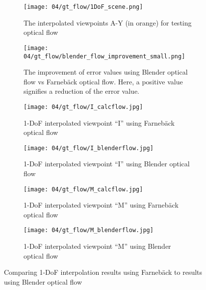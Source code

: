 \begin{figure}
\centering
    \hfill
    \begin{subfigure}[c]{0.4\textwidth}
            \centering
            \texttt{[image: 04/gt\_flow/1DoF\_scene.png]}
            \caption{The interpolated viewpoints A-Y (in orange) for testing optical flow}
    \end{subfigure}
    \hfill
    \begin{subfigure}[c]{0.4\textwidth}
            \centering
            \texttt{[image: 04/gt\_flow/blender\_flow\_improvement\_small.png]}
            \caption{The improvement of error values using Blender optical flow vs Farneb\"ack optical flow. Here, a positive value signifies a reduction of the error value.}
    \end{subfigure}
    \hfill
    \hfill
\par\bigskip
    \hfill
    \begin{subfigure}[b]{0.4\textwidth}
            \centering
            \texttt{[image: 04/gt\_flow/I\_calcflow.jpg]}
            \caption{1-DoF interpolated viewpoint ``I'' using Farneb\"ack optical flow}
    \end{subfigure}
    \hfill
    \begin{subfigure}[b]{0.4\textwidth}
            \centering
            \texttt{[image: 04/gt\_flow/I\_blenderflow.jpg]}
            \caption{1-DoF interpolated viewpoint ``I'' using Blender optical flow}
    \end{subfigure}
    \hfill
    \hfill
\par\bigskip
    \hfill
    \begin{subfigure}[b]{0.4\textwidth}
            \centering
            \texttt{[image: 04/gt\_flow/M\_calcflow.jpg]}
            \caption{1-DoF interpolated viewpoint ``M'' using Farneb\"ack optical flow}
    \end{subfigure}
    \hfill
    \begin{subfigure}[b]{0.4\textwidth}
            \centering
            \texttt{[image: 04/gt\_flow/M\_blenderflow.jpg]}
            \caption{1-DoF interpolated viewpoint ``M'' using Blender optical flow}
    \end{subfigure}
    \hfill
    \hfill
  \caption[Comparing 1-DoF interpolation results using calculated vs Blender optical flow]{Comparing 1-DoF interpolation results using Farneb\"ack to results using Blender optical flow} \label{fig:of_comparison}
\end{figure}

